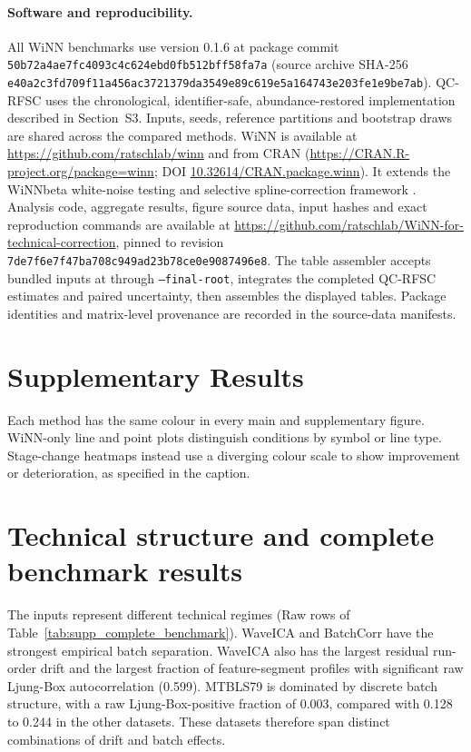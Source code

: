 \documentclass[namedate,webpdf,modern,large,nocrop]{oup-authoring-template}
\begin{document}
\paragraph{Software and reproducibility.} All WiNN benchmarks use version 0.1.6 at package commit \texttt{50b72a4ae7fc4093c4c624ebd0fb512bff58fa7a} (source archive SHA-256 \texttt{e40a2c3fd709f11a456ac3721379da3549e89c619e5a164743e203fe1e9be7ab}). QC-RFSC uses the chronological, identifier-safe, abundance-restored implementation described in Section~S3. Inputs, seeds, reference partitions and bootstrap draws are shared across the compared methods. WiNN is available at \url{https://github.com/ratschlab/winn} and from CRAN (\url{https://CRAN.R-project.org/package=winn}; DOI \href{https://doi.org/10.32614/CRAN.package.winn}{10.32614/CRAN.package.winn}). It extends the WiNNbeta white-noise testing and selective spline-correction framework \citep{Demler2024WiNNbeta}. Analysis code, aggregate results, figure source data, input hashes and exact reproduction commands are available at \url{https://github.com/ratschlab/WiNN-for-technical-correction}, pinned to revision \texttt{7de7f6e7f47ba708c949ad23b78ce0e9087496e8}. The table assembler accepts bundled inputs at  through \texttt{--final-root}, integrates the completed QC-RFSC estimates and paired uncertainty, then assembles the displayed tables. Package identities and matrix-level provenance are recorded in the source-data manifests.

\section*{Supplementary Results}

Each method has the same colour in every main and supplementary figure. WiNN-only line and point plots distinguish conditions by symbol or line type. Stage-change heatmaps instead use a diverging colour scale to show improvement or deterioration, as specified in the caption.

\section{Technical structure and complete benchmark results}
\label{sec:supp_complete_benchmark}

The inputs represent different technical regimes (Raw rows of Table~\ref{tab:supp_complete_benchmark}). WaveICA and BatchCorr have the strongest empirical batch separation. WaveICA also has the largest residual run-order drift and the largest fraction of feature-segment profiles with significant raw Ljung-Box autocorrelation (0.599). MTBLS79 is dominated by discrete batch structure, with a raw Ljung-Box-positive fraction of 0.003, compared with 0.128 to 0.244 in the other datasets. These datasets therefore span distinct combinations of drift and batch effects.
\end{document}
